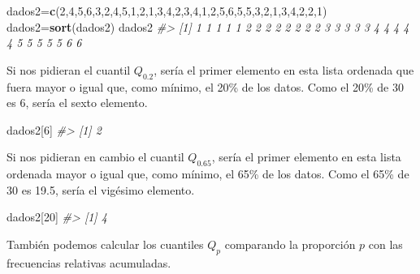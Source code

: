 \documentclass[
]{book}
\newenvironment{Shaded}{\begin{snugshade}}{\end{snugshade}}
\newcommand{\CommentTok}[1]{\textcolor[rgb]{0.56,0.35,0.01}{\textit{#1}}}
\newcommand{\DecValTok}[1]{\textcolor[rgb]{0.00,0.00,0.81}{#1}}
\newcommand{\KeywordTok}[1]{\textcolor[rgb]{0.13,0.29,0.53}{\textbf{#1}}}
\newcommand{\NormalTok}[1]{#1}
\theoremstyle{definition}
\theoremstyle{definition}
\theoremstyle{definition}
\theoremstyle{remark}
\begin{document}
\begin{Shaded}
\begin{Highlighting}[]
\NormalTok{dados2=}\KeywordTok{c}\NormalTok{(}\DecValTok{2}\NormalTok{,}\DecValTok{4}\NormalTok{,}\DecValTok{5}\NormalTok{,}\DecValTok{6}\NormalTok{,}\DecValTok{3}\NormalTok{,}\DecValTok{2}\NormalTok{,}\DecValTok{4}\NormalTok{,}\DecValTok{5}\NormalTok{,}\DecValTok{1}\NormalTok{,}\DecValTok{2}\NormalTok{,}\DecValTok{1}\NormalTok{,}\DecValTok{3}\NormalTok{,}\DecValTok{4}\NormalTok{,}\DecValTok{2}\NormalTok{,}\DecValTok{3}\NormalTok{,}\DecValTok{4}\NormalTok{,}\DecValTok{1}\NormalTok{,}\DecValTok{2}\NormalTok{,}\DecValTok{5}\NormalTok{,}\DecValTok{6}\NormalTok{,}\DecValTok{5}\NormalTok{,}\DecValTok{5}\NormalTok{,}\DecValTok{3}\NormalTok{,}\DecValTok{2}\NormalTok{,}\DecValTok{1}\NormalTok{,}\DecValTok{3}\NormalTok{,}\DecValTok{4}\NormalTok{,}\DecValTok{2}\NormalTok{,}\DecValTok{2}\NormalTok{,}\DecValTok{1}\NormalTok{)}
\NormalTok{dados2=}\KeywordTok{sort}\NormalTok{(dados2)}
\NormalTok{dados2}
\CommentTok{\#\textgreater{}  [1] 1 1 1 1 1 2 2 2 2 2 2 2 2 3 3 3 3 3 4 4 4 4 4 5 5 5 5 5 6 6}
\end{Highlighting}
\end{Shaded}

Si nos pidieran el cuantil \(Q_{0.2}\), sería el primer elemento en esta lista ordenada que fuera mayor o igual que, como mínimo, el 20\% de los datos. Como el 20\% de 30 es 6, sería el sexto elemento.

\begin{Shaded}
\begin{Highlighting}[]
\NormalTok{dados2[}\DecValTok{6}\NormalTok{]}
\CommentTok{\#\textgreater{} [1] 2}
\end{Highlighting}
\end{Shaded}

Si nos pidieran en cambio el cuantil \(Q_{0.65}\), sería el primer elemento en esta lista ordenada mayor o igual que, como mínimo, el 65\% de los datos. Como el 65\% de 30 es 19.5, sería el vigésimo elemento.

\begin{Shaded}
\begin{Highlighting}[]
\NormalTok{dados2[}\DecValTok{20}\NormalTok{]}
\CommentTok{\#\textgreater{} [1] 4}
\end{Highlighting}
\end{Shaded}

También podemos calcular los cuantiles \(Q_p\) comparando la proporción \(p\) con las frecuencias relativas acumuladas.
\end{document}
